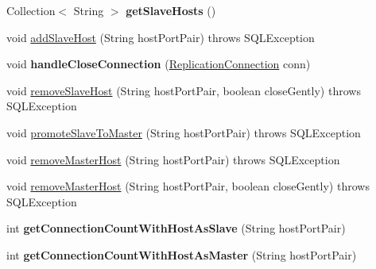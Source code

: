 \begin{DoxyCompactItemize}
Collection$<$ String $>$ {\bfseries get\+Slave\+Hosts} ()
\item 
void \mbox{\hyperlink{classcom_1_1mysql_1_1cj_1_1jdbc_1_1ha_1_1_replication_connection_group_af6b5ef78b532f8eb4cf0529d482076f3}{add\+Slave\+Host}} (String host\+Port\+Pair)  throws S\+Q\+L\+Exception 
\item 
\mbox{\label{classcom_1_1mysql_1_1cj_1_1jdbc_1_1ha_1_1_replication_connection_group_a62b72dc65b8fc6e2399f2812e3ae75fd}} 
void {\bfseries handle\+Close\+Connection} (\mbox{\hyperlink{interfacecom_1_1mysql_1_1cj_1_1jdbc_1_1ha_1_1_replication_connection}{Replication\+Connection}} conn)
\item 
void \mbox{\hyperlink{classcom_1_1mysql_1_1cj_1_1jdbc_1_1ha_1_1_replication_connection_group_a9aa1953764777765fa5c2b58498534a1}{remove\+Slave\+Host}} (String host\+Port\+Pair, boolean close\+Gently)  throws S\+Q\+L\+Exception 
\item 
void \mbox{\hyperlink{classcom_1_1mysql_1_1cj_1_1jdbc_1_1ha_1_1_replication_connection_group_a15c7ea25c34ea77f3dedaa68eb05075d}{promote\+Slave\+To\+Master}} (String host\+Port\+Pair)  throws S\+Q\+L\+Exception 
\item 
void \mbox{\hyperlink{classcom_1_1mysql_1_1cj_1_1jdbc_1_1ha_1_1_replication_connection_group_a89849560352e7621bd8133af1af0dd3e}{remove\+Master\+Host}} (String host\+Port\+Pair)  throws S\+Q\+L\+Exception 
\item 
void \mbox{\hyperlink{classcom_1_1mysql_1_1cj_1_1jdbc_1_1ha_1_1_replication_connection_group_a63d001e066840fdb7b35f01464baedb0}{remove\+Master\+Host}} (String host\+Port\+Pair, boolean close\+Gently)  throws S\+Q\+L\+Exception 
\item 
\mbox{\label{classcom_1_1mysql_1_1cj_1_1jdbc_1_1ha_1_1_replication_connection_group_ac128b6e69705e82273438c8fac8a5a45}} 
int {\bfseries get\+Connection\+Count\+With\+Host\+As\+Slave} (String host\+Port\+Pair)
\item 
\mbox{\label{classcom_1_1mysql_1_1cj_1_1jdbc_1_1ha_1_1_replication_connection_group_a87f8a90ba0fad1cf31cf8e851806c01e}} 
int {\bfseries get\+Connection\+Count\+With\+Host\+As\+Master} (String host\+Port\+Pair)
\item 

\end{DoxyCompactItemize}
